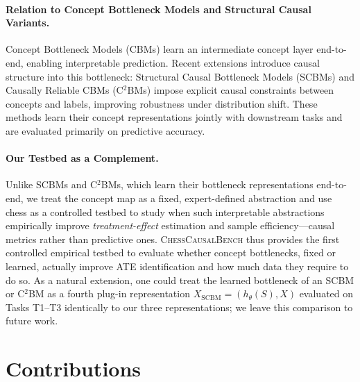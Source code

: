 \documentclass[11pt]{article}
\begin{document}
\paragraph{Relation to Concept Bottleneck Models and Structural Causal Variants.}
Concept Bottleneck Models (CBMs)\cite{koh2020concept} learn an intermediate concept
layer end-to-end, enabling interpretable prediction. Recent extensions introduce
causal structure into this bottleneck: Structural Causal Bottleneck Models
(SCBMs) and Causally Reliable CBMs (C$^2$BMs)\cite{fromCausalToConcept} impose
explicit causal constraints between concepts and labels, improving robustness under
distribution shift. These methods learn their concept representations jointly with
downstream tasks and are evaluated primarily on predictive accuracy.

\paragraph{Our Testbed as a Complement.}
Unlike SCBMs and C$^2$BMs, which learn their bottleneck representations end-to-end,
we treat the concept map as a fixed, expert-defined abstraction and use chess as a
controlled testbed to study when such interpretable abstractions empirically improve
\emph{treatment-effect} estimation and sample efficiency---causal metrics rather
than predictive ones.\cite{fromCausalToConcept,scholkopf2021towards}
\textsc{ChessCausalBench} thus provides the first controlled empirical testbed to
evaluate whether concept bottlenecks, fixed or learned, actually improve ATE
identification and how much data they require to do so. As a natural extension, one
could treat the learned bottleneck of an SCBM or C$^2$BM as a fourth plug-in
representation $X_{\text{SCBM}} = (h_\theta(S), X)$ evaluated on Tasks T1--T3
identically to our three representations; we leave this comparison to future work.

\section*{Contributions}
\end{document}
